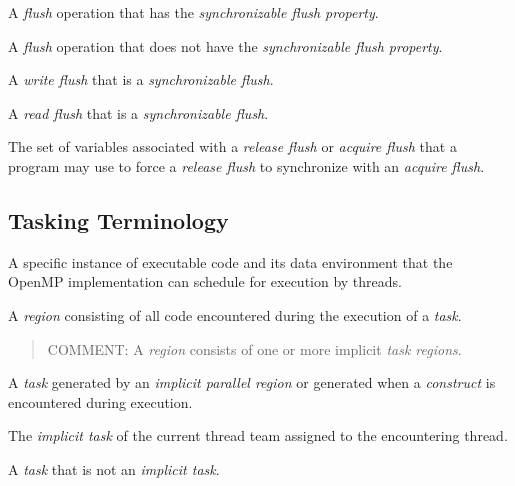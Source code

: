 \glossarydefstart
A \emph{flush} operation that has the \emph{synchronizable flush property}.
\glossarydefend

\glossarydefstart
A \emph{flush} operation that does not have the \emph{synchronizable flush
property}.
\glossarydefend

\glossarydefstart
A \emph{write flush} that is a \emph{synchronizable flush}.
\glossarydefend

\glossarydefstart
A \emph{read flush} that is a \emph{synchronizable flush}.
\glossarydefend

\glossarydefstart
The set of variables associated with a \emph{release flush} or \emph{acquire flush} that a
program may use to force a \emph{release flush} to synchronize with an \emph{acquire flush}.
\glossarydefend





\subsection{Tasking Terminology}
\label{subsec:Tasking Terminology}
\glossarydefstart
A specific instance of executable code and its data environment that the
OpenMP implementation can schedule for execution by threads.
\glossarydefend

\glossarydefstart
A \emph{region} consisting of all code encountered during the execution of a \emph{task}. 

\begin{quote}
COMMENT: A  \emph{region} consists of one or more implicit \emph{task regions}. 
\end{quote}
\glossarydefend

\glossarydefstart
A \emph{task} generated by an \emph{implicit parallel region} or generated when a 
\emph{construct} is encountered during execution.
\glossarydefend

\glossarydefstart
The \emph{implicit task} of the current thread team assigned to the encountering thread.
\glossarydefend

\glossarydefstart
A \emph{task} that is not an \emph{implicit task}.
\glossarydefend

